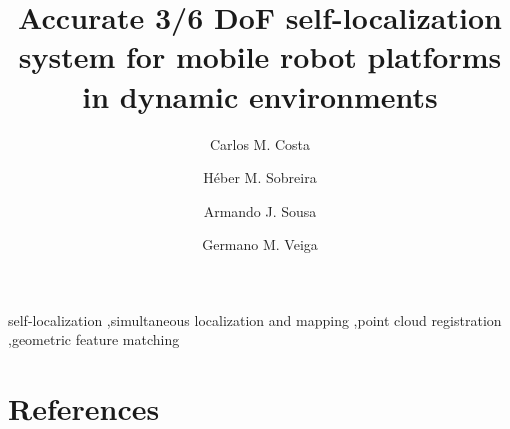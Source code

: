 










\begin{frontmatter}

\title{Accurate 3/6 DoF self-localization system for mobile robot platforms in dynamic environments}


\author[inesc-address]{Carlos M. Costa}

\author[inesc-address]{Héber M. Sobreira}

\author[inesc-address]{Armando J. Sousa}

\author[inesc-address]{Germano M. Veiga}

\address[inesc-address]{INESC TEC, Rua Dr. Roberto Frias, 4200-465 Porto, Portugal}





\begin{keyword}
self-localization \sep simultaneous localization and mapping \sep point cloud registration \sep geometric feature matching
\end{keyword}

\end{frontmatter}




%










\section*{References}






